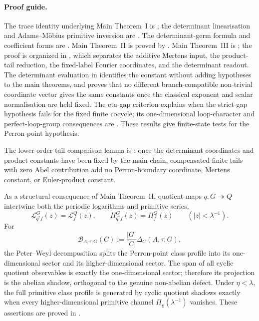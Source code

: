 \documentclass[11pt,a4paper]{amsart}
\theoremstyle{plain}
\theoremstyle{definition}
\theoremstyle{remark}
\begin{document}
\paragraph{Proof guide.}
  The trace identity underlying Main Theorem~I is
  ; the determinant linearisation and
  Adams--M\"obius primitive inversion are
  .
  The determinant-germ formula and coefficient forms are
  .  Main Theorem~II is proved by
  .  Main Theorem~III is
  ; the proof is organized in
  , which separates the additive
  Mertens input, the product-tail reduction, the fixed-label Fourier
  coordinates, and the determinant readout. The determinant evaluation in
  identifies the constant without adding hypotheses to the main theorems, and
   proves that no different
  branch-compatible non-trivial coordinate vector gives the same constants once
  the classical exponent and scalar normalisation are held fixed.
  The eta-gap criterion  explains when the
  strict-gap hypothesis fails for the fixed finite cocycle; its one-dimensional loop-character and
  perfect-loop-group consequences are
  .
  These results give finite-state tests for the Perron-point hypothesis.

  The lower-order-tail comparison lemma is
  : once the determinant
  coordinates and product constants have been fixed by the main chain,
  compensated finite tails with zero Abel contribution add no Perron-boundary
  coordinate, Mertens constant, or Euler-product constant.

As a structural consequence of Main Theorem~II, quotient maps
\(q:G\twoheadrightarrow Q\) intertwine both the periodic logarithms and
primitive series,
\[
  \mathcal L_{q^\ast f}^{G}(z)=\mathcal L_f^{Q}(z),
  \qquad
  \Pi_{q^\ast f}^{G}(z)=\Pi_f^{Q}(z)
  \qquad(|z|<\lambda^{-1}).
\]
For
\[
  \mathcal B_{A,\tau;G}(C):=\frac{|G|}{|C|}\Delta_C(A,\tau;G),
\]
the Peter--Weyl decomposition splits the Perron-point class profile into
its one-dimensional sector and its higher-dimensional sector. The span of
all cyclic quotient observables is exactly the one-dimensional sector;
therefore its projection is the abelian shadow, orthogonal to the genuine
non-abelian defect. Under \(\eta<\lambda\), the full primitive class
profile is generated by cyclic quotient shadows exactly when every
higher-dimensional primitive channel
\(\Pi_\varrho(\lambda^{-1})\) vanishes. These assertions are proved in
.
\end{document}
